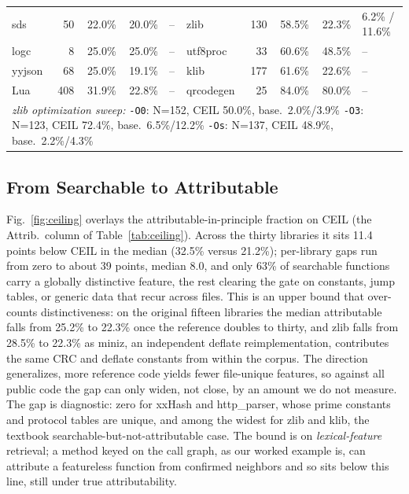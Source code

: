 \documentclass[conference]{IEEEtran}
\begin{document}
\begin{table}[t]
\begin{tabular}{lrrr@{\hskip 4pt}l@{\hskip 10pt}lrrr@{\hskip 4pt}l}
sds          & 50  & 22.0\% & 20.0\% & --              & zlib           & 130 & 58.5\% & 22.3\% & 6.2\% / 11.6\% \\
logc         & 8   & 25.0\% & 25.0\% & --              & utf8proc       & 33  & 60.6\% & 48.5\% & -- \\
yyjson       & 68  & 25.0\% & 19.1\% & --              & klib           & 177 & 61.6\% & 22.6\% & -- \\
Lua          & 408 & 31.9\% & 22.8\% & --              & qrcodegen      & 25  & 84.0\% & 80.0\% & -- \\
\midrule
\multicolumn{10}{l}{\textit{zlib optimization sweep:}\quad
  \texttt{-O0}: N=152, CEIL 50.0\%, base.\ 2.0\%/3.9\%\quad
  \texttt{-O3}: N=123, CEIL 72.4\%, base.\ 6.5\%/12.2\%\quad
  \texttt{-Os}: N=137, CEIL 48.9\%, base.\ 2.2\%/4.3\%} \\
\bottomrule
\end{tabular}
\end{table}

\subsection{From Searchable to Attributable}
Fig.~\ref{fig:ceiling} overlays the attributable-in-principle fraction on CEIL (the
Attrib.\ column of Table~\ref{tab:ceiling}). Across the thirty libraries it sits 11.4
points below CEIL in the median (32.5\% versus 21.2\%); per-library gaps run from zero to
about 39 points, median 8.0, and only 63\% of searchable functions carry a globally
distinctive feature, the rest clearing the gate on constants, jump tables, or generic
data that recur across files. This is an upper bound that over-counts distinctiveness:
on the original fifteen libraries the median attributable falls from 25.2\% to 22.3\%
once the reference doubles to thirty, and zlib falls from 28.5\% to 22.3\% as miniz, an
independent deflate reimplementation, contributes the same CRC and deflate constants
from within the corpus. The direction generalizes, more reference code yields fewer
file-unique features, so against all public code the gap can only widen, not close, by
an amount we do not measure. The gap is diagnostic: zero for xxHash and http\_parser,
whose prime constants and protocol tables are unique, and among the widest for zlib and
klib, the
textbook searchable-but-not-attributable case. The bound is on \emph{lexical-feature}
retrieval; a method keyed on the call graph, as our worked example is, can attribute a
featureless function from confirmed neighbors and so sits below this line, still under
true attributability.
\end{document}
